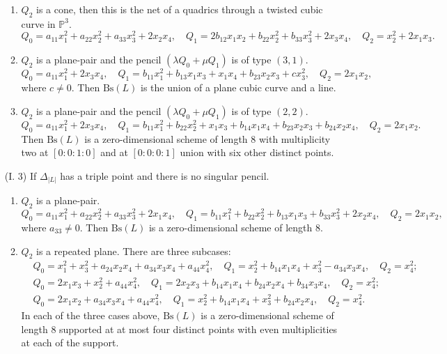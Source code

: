 \documentclass{amsart}[12pt]
\theoremstyle{definition}
\theoremstyle{remark}
\numberwithin{equation}{section}
\newcommand{\abs}[1]{\lvert#1\rvert}
\begin{document}
\begin{itemize}
\begin{enumerate}
\item $Q_2$ is a cone, then this is the net of a quadrics through a twisted cubic curve in $\mathbb{P}^3$.
\[ 
Q_0 = a_{11}x_1^2 + a_{22}x_2^2 + a_{33}x_3^2 + 2x_2x_4, \quad Q_1 = 2b_{12}x_1x_2 + b_{22}x_2^2 + b_{33}x_3^2 + 2x_3x_4, \quad Q_2 = x_2^2 + 2x_1x_3.
\]
\item $Q_2$ is a plane-pair and the pencil $(\lambda Q_0 + \mu Q_1)$ is of type $(3, 1)$.
\[
Q_0 = a_{11}x_1^2 + 2x_3x_4, \quad Q_1 = b_{11}x_1^2 + b_{13}x_1x_3 + x_1x_4 + b_{23}x_2x_3 + cx_3^2, \quad Q_2 = 2x_1x_2, 
\]
where $c \neq 0$. Then $\mathrm{Bs}(L)$ is the union of a plane cubic curve and a line.
\item $Q_2$ is a plane-pair and the pencil $(\lambda Q_0 + \mu Q_1)$ is of type $(2, 2)$.
\[ 
Q_0 = a_{11}x_1^2 + 2x_3x_4, \quad Q_1 = b_{11}x_1^2 + b_{22}x_2^2 + x_1x_3 + b_{14}x_1x_4 + b_{23}x_2x_3 + b_{24}x_2x_4, \quad Q_2 = 2x_1x_2.
\]
Then $\mathrm{Bs}(L)$ is a zero-dimensional scheme of length 8 with multiplicity two at $[0 \colon 0 \colon 1 \colon 0]$ and at $[0 \colon 0 \colon 0 \colon 1]$ union with six other distinct points.
\end{enumerate}
\item[(I. 3)] If $\Delta_{\abs{L}}$ has a triple point and there is no singular pencil.
\begin{enumerate}
\item $Q_2$ is a plane-pair. 
\[ 
Q_0 = a_{11}x_1^2 + a_{22}x_2^2 + a_{33}x_3^2 + 2x_1x_4, \quad Q_1 = b_{11}x_1^2 + b_{22}x_2^2 + b_{13}x_1x_3 + b_{33}x_3^2 + 2x_2x_4, \quad Q_2 = 2x_1x_2,
\]
where $a_{33} \neq 0$. Then $\mathrm{Bs}(L)$ is a zero-dimensional scheme of length 8.
\item $Q_2$ is a repeated plane. There are three subcases:
\begin{align*}
& Q_0 = x_1^2 + x_3^2 + a_{24}x_2x_4 + a_{34}x_3x_4 + a_{44}x_4^2, \quad Q_1 = x_2^2 + b_{14}x_1x_4 + x_3^2 - a_{34}x_3x_4, \quad Q_2 = x_4^2; \\
& Q_0 = 2x_1x_3 + x_2^2 + a_{44}x_4^2, \quad Q_1 = 2x_2x_3 + b_{14}x_1x_4 + b_{24}x_2x_4 + b_{34}x_3x_4, \quad Q_2 = x_4^2; \\
& Q_0 = 2x_1x_2 + a_{34}x_3x_4 + a_{44}x_4^2, \quad Q_1 = x_2^2 + b_{14}x_1x_4 + x_3^2 + b_{24}x_2x_4, \quad Q_2 = x_4^2.
\end{align*}
In each of the three cases above, $\mathrm{Bs}(L)$ is a zero-dimensional scheme of length 8 supported at at most four distinct points with even multiplicities at each of the support.
\end{enumerate}

\end{itemize}
\end{document}
